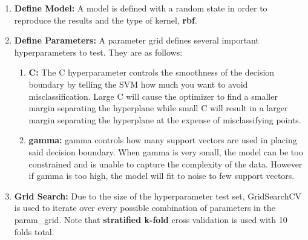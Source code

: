 \documentclass[11pt]{article}
\begin{document}
	\begin{enumerate}
		\item \textbf{Define Model:} A model is defined with a random state in order to reproduce the results and the type of kernel, \textbf{rbf}.
		\item \textbf{Define Parameters:} A parameter grid defines several important hyperparameters to test. They are as follows:
		\begin{enumerate}
			\item \textbf{C:} The C hyperparameter controls the smoothness of the decision boundary by telling the SVM  how much you want to avoid misclassification. Large C will cause the optimizer to find a smaller margin separating the hyperplane while small C will result in a larger margin separating the hyperplane at the expense of misclassifying points.
			\item \textbf{gamma:} gamma controls how many support vectors are used in placing said decision boundary. When gamma is very small, the model can be too constrained and is unable to capture the complexity of the data. However if gamma is too high, the model will fit to noise to few support vectors.
		\end{enumerate}
		\item \textbf{Grid Search:} Due to the size of the hyperparameter test set, GridSearchCV is used to iterate over every possible combination of parameters in the param\_grid. Note that \textbf{stratified k-fold} cross validation is used with 10 folds total. 
	\end{enumerate}	
\end{document}
